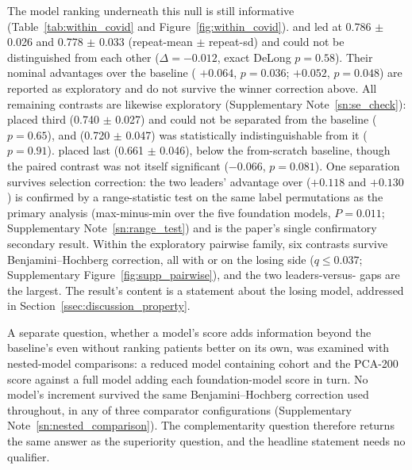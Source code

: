 The model ranking underneath this null is still informative
(Table~\ref{tab:within_covid} and Figure~\ref{fig:within_covid}).  and  led at
0.786 $\pm$ 0.026 and 0.778 $\pm$ 0.033 (repeat-mean $\pm$ repeat-sd) and
could not be distinguished from each other ($\Delta = -0.012$, exact DeLong
$p = 0.58$). Their nominal advantages over the baseline (
$+0.064$, $p = 0.036$;  $+0.052$, $p = 0.048$) are reported as
exploratory and do not survive the winner correction above. All remaining
contrasts are likewise exploratory
(Supplementary Note~\ref{sn:se_check}):
 placed third (0.740 $\pm$ 0.027) and could not be separated
from the baseline ($p = 0.65$), and  (0.720 $\pm$ 0.047) was
statistically indistinguishable from it ($p = 0.91$).  placed last
(0.661 $\pm$ 0.046), below the from-scratch baseline, though the paired
contrast was not itself significant ($-0.066$, $p = 0.081$). One separation
survives selection correction: the two leaders' advantage over 
($+0.118$ and $+0.130$) is confirmed by a range-statistic test on the same
label permutations as the primary analysis (max-minus-min over the five
foundation models, $P = 0.011$; Supplementary Note~\ref{sn:range_test}) and
is the paper's single confirmatory secondary result. Within the exploratory
pairwise family, six contrasts survive Benjamini--Hochberg correction, all
with  or  on the losing side ($q \leq 0.037$;
Supplementary Figure~\ref{fig:supp_pairwise}), and the two
leaders-versus- gaps are the largest. The result's content is a
statement about the losing model, addressed in
Section~\ref{ssec:discussion_property}.

A separate question, whether a model's score adds information beyond the
baseline's even without ranking patients better on its own, was examined with
nested-model comparisons: a reduced model containing cohort and the PCA-200
score against a full model adding each foundation-model score in turn. No
model's increment survived the same Benjamini--Hochberg correction used
throughout, in any of three comparator configurations
(Supplementary Note~\ref{sn:nested_comparison}). The complementarity question
therefore returns the same answer as the superiority question, and the
headline statement needs no qualifier.

